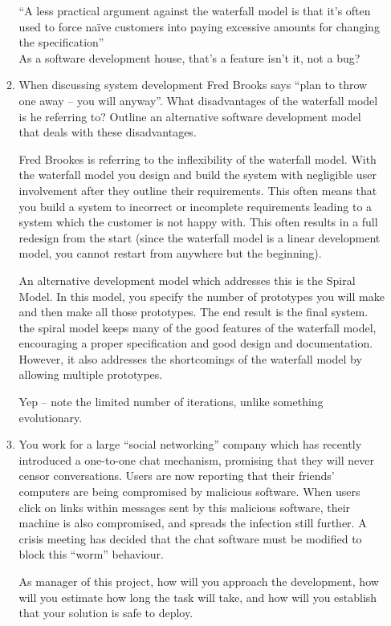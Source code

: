 \documentclass[10pt,\jkfside,a4paper]{article}
\begin{document}
\begin{enumerate}
\begin{enumerate}[label=(\alph*)]
{\color{blue}
``A less practical argument against the waterfall model is that it's often used to force na\"ive customers
into paying excessive amounts for changing the specification''\\
As a software development house, that's a feature isn't it, not a bug?
}

\item When discussing system development Fred Brooks says ``plan to throw one away -- you will anyway''.
What disadvantages of the waterfall model is he referring to?
Outline an alternative software development model that deals with these disadvantages.

Fred Brookes is referring to the inflexibility of the waterfall model. With the waterfall model you design and build
the system with negligible user involvement after they outline their requirements. This often means that you build a
system to incorrect or incomplete requirements leading to a system which the customer is not happy with. This often
results in a full redesign from the start (since the waterfall model is a linear development model, you cannot
restart from anywhere but the beginning).

An alternative development model which addresses this is the Spiral Model. In this model, you specify the number of
prototypes you will make and then make all those prototypes. The end result is the final system. the spiral model
keeps many of the good features of the waterfall model, encouraging a proper specification and good design and
documentation. However, it also addresses the shortcomings of the waterfall model by allowing multiple prototypes.

{\color{blue}
Yep -- note the limited number of iterations, unlike something evolutionary.
}

\item You work for a large ``social networking'' company which has recently introduced a one-to-one chat mechanism,
promising that they will never censor conversations.
Users are now reporting that their friends' computers are being compromised by malicious software.
When users click on links within messages sent by this malicious software, their machine is also compromised,
and spreads the infection still further.
A crisis meeting has decided that the chat software must be modified to block this ``worm'' behaviour.

As manager of this project, how will you approach the development, how will you estimate how long the
task will take, and how will you establish that your solution is safe to deploy.


\end{enumerate}
\end{enumerate}
\end{document}
